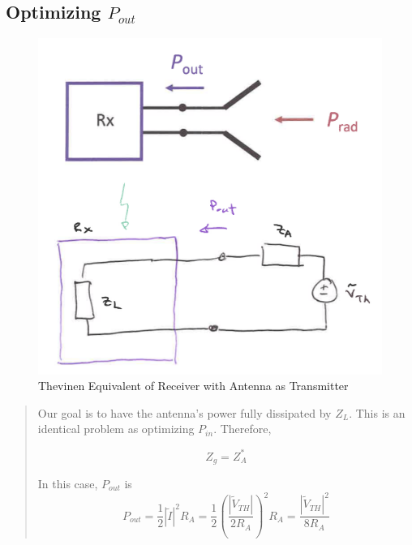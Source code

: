 \documentclass{article} %
\begin{document}
\subsection{Optimizing $P_{out}$}

\begin{figure}[H]
    \centering
    \includegraphics[width=1\textwidth]{./image/figure6.png}
    \caption{Thevinen Equivalent of Receiver with Antenna as Transmitter}
\end{figure}

\begin{quote}
    Our goal is to have the antenna's power fully dissipated by $Z_L$.
    This is an identical problem as optimizing $P_{in}$. Therefore,

    \[Z_g = Z_A^*\]

    In this case, $P_{out}$ is
    \[P_{out} = \frac{1}{2}|\tilde{I}|^2 R_A = \frac{1}{2}\left(\frac{|\tilde{V}_{TH}|}{2R_A}\right)^2R_A = \frac{|\tilde{V}_{TH}|^2}{8R_A}\]
\end{quote}
\end{document}
